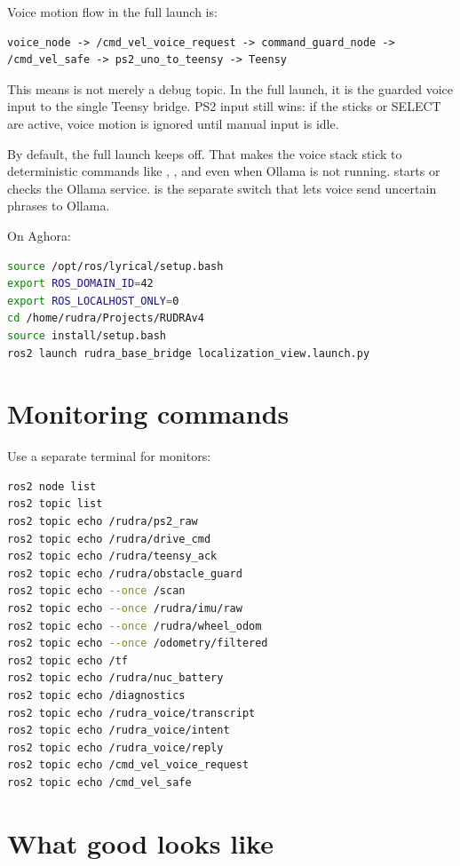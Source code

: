 Voice motion flow in the full launch is:

\begin{lstlisting}
voice_node -> /cmd_vel_voice_request -> command_guard_node -> /cmd_vel_safe -> ps2_uno_to_teensy -> Teensy
\end{lstlisting}

This means  is not merely a debug topic. In the full launch, it is the guarded voice input to the single Teensy bridge. PS2 input still wins: if the sticks or SELECT are active, voice motion is ignored until manual input is idle.

By default, the full launch keeps  off. That makes the voice stack stick to deterministic commands like , , and  even when Ollama is not running.  starts or checks the Ollama service.  is the separate switch that lets voice send uncertain phrases to Ollama.

On Aghora:

\begin{lstlisting}[language=bash]
source /opt/ros/lyrical/setup.bash
export ROS_DOMAIN_ID=42
export ROS_LOCALHOST_ONLY=0
cd /home/rudra/Projects/RUDRAv4
source install/setup.bash
ros2 launch rudra_base_bridge localization_view.launch.py
\end{lstlisting}

\section{Monitoring commands}

Use a separate terminal for monitors:

\begin{lstlisting}[language=bash]
ros2 node list
ros2 topic list
ros2 topic echo /rudra/ps2_raw
ros2 topic echo /rudra/drive_cmd
ros2 topic echo /rudra/teensy_ack
ros2 topic echo /rudra/obstacle_guard
ros2 topic echo --once /scan
ros2 topic echo --once /rudra/imu/raw
ros2 topic echo --once /rudra/wheel_odom
ros2 topic echo --once /odometry/filtered
ros2 topic echo /tf
ros2 topic echo /rudra/nuc_battery
ros2 topic echo /diagnostics
ros2 topic echo /rudra_voice/transcript
ros2 topic echo /rudra_voice/intent
ros2 topic echo /rudra_voice/reply
ros2 topic echo /cmd_vel_voice_request
ros2 topic echo /cmd_vel_safe
\end{lstlisting}

\section{What good looks like}

